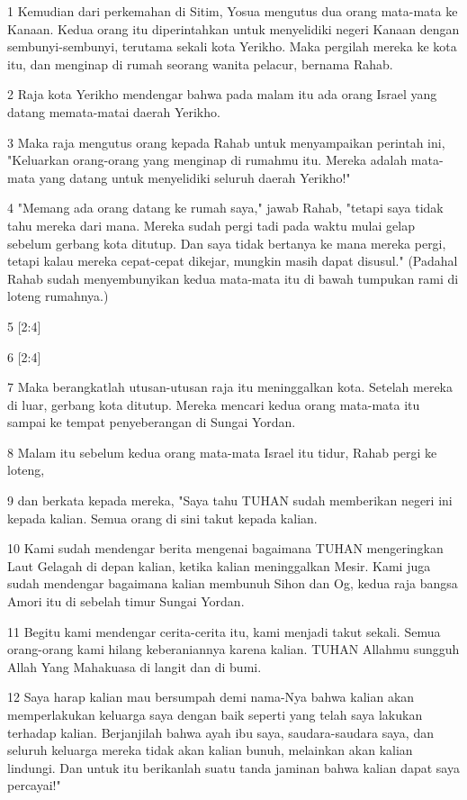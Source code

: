 \par 1 Kemudian dari perkemahan di Sitim, Yosua mengutus dua orang mata-mata ke Kanaan. Kedua orang itu diperintahkan untuk menyelidiki negeri Kanaan dengan sembunyi-sembunyi, terutama sekali kota Yerikho. Maka pergilah mereka ke kota itu, dan menginap di rumah seorang wanita pelacur, bernama Rahab.
\par 2 Raja kota Yerikho mendengar bahwa pada malam itu ada orang Israel yang datang memata-matai daerah Yerikho.
\par 3 Maka raja mengutus orang kepada Rahab untuk menyampaikan perintah ini, "Keluarkan orang-orang yang menginap di rumahmu itu. Mereka adalah mata-mata yang datang untuk menyelidiki seluruh daerah Yerikho!"
\par 4 "Memang ada orang datang ke rumah saya," jawab Rahab, "tetapi saya tidak tahu mereka dari mana. Mereka sudah pergi tadi pada waktu mulai gelap sebelum gerbang kota ditutup. Dan saya tidak bertanya ke mana mereka pergi, tetapi kalau mereka cepat-cepat dikejar, mungkin masih dapat disusul." (Padahal Rahab sudah menyembunyikan kedua mata-mata itu di bawah tumpukan rami di loteng rumahnya.)
\par 5 [2:4]
\par 6 [2:4]
\par 7 Maka berangkatlah utusan-utusan raja itu meninggalkan kota. Setelah mereka di luar, gerbang kota ditutup. Mereka mencari kedua orang mata-mata itu sampai ke tempat penyeberangan di Sungai Yordan.
\par 8 Malam itu sebelum kedua orang mata-mata Israel itu tidur, Rahab pergi ke loteng,
\par 9 dan berkata kepada mereka, "Saya tahu TUHAN sudah memberikan negeri ini kepada kalian. Semua orang di sini takut kepada kalian.
\par 10 Kami sudah mendengar berita mengenai bagaimana TUHAN mengeringkan Laut Gelagah di depan kalian, ketika kalian meninggalkan Mesir. Kami juga sudah mendengar bagaimana kalian membunuh Sihon dan Og, kedua raja bangsa Amori itu di sebelah timur Sungai Yordan.
\par 11 Begitu kami mendengar cerita-cerita itu, kami menjadi takut sekali. Semua orang-orang kami hilang keberaniannya karena kalian. TUHAN Allahmu sungguh Allah Yang Mahakuasa di langit dan di bumi.
\par 12 Saya harap kalian mau bersumpah demi nama-Nya bahwa kalian akan memperlakukan keluarga saya dengan baik seperti yang telah saya lakukan terhadap kalian. Berjanjilah bahwa ayah ibu saya, saudara-saudara saya, dan seluruh keluarga mereka tidak akan kalian bunuh, melainkan akan kalian lindungi. Dan untuk itu berikanlah suatu tanda jaminan bahwa kalian dapat saya percayai!"
